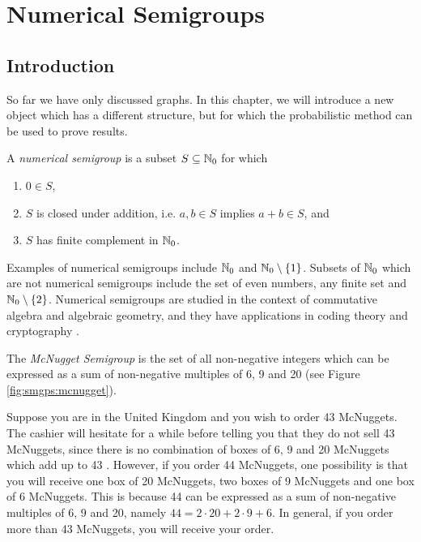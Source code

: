 \chapter{Numerical Semigroups}\label{chap:numsems}

\section{Introduction}\label{sec:smgps:intro}

So far we have only discussed graphs. In this chapter, we will introduce a new object which has a different structure, but for which the probabilistic method can be used to prove results. \par

\begin{definition} \cite{rosales2009numerical}
    A \textit{numerical semigroup} is a subset $S \subseteq \mathbb{N}_{0}$ for which 
    \begin{enumerate}
        \item $0 \in S$,
        \item $S$ is closed under addition, i.e. $a, b \in S$ implies $a + b \in S$, and
        \item $S$ has finite complement in $\mathbb{N}_{0}$.
    \end{enumerate}
\end{definition}

Examples of numerical semigroups include $\mathbb{N}_{0}$ and $\mathbb{N}_{0} \setminus \{1\}$. Subsets of $\mathbb{N}_0$ which are not numerical semigroups include the set of even numbers, any finite set and $\mathbb{N}_0 \setminus \{2\}$. Numerical semigroups are studied in the context of commutative algebra and algebraic geometry, and they have applications in coding theory and cryptography \cite{assi2020numerical}. \par

\begin{example}\label{ex:smgps:mcnugget}
    The \textit{McNugget Semigroup} is the set of all non-negative integers which can be expressed as a sum of non-negative multiples of 6, 9 and 20 (see Figure \ref{fig:smgps:mcnugget}).
\end{example}

Suppose you are in the United Kingdom and you wish to order 43 McNuggets. The cashier will hesitate for a while before telling you that they do not sell 43 McNuggets, since there is no combination of boxes of 6, 9 and 20 McNuggets which add up to 43 \cite{youtube}. However, if you order 44 McNuggets, one possibility is that you will receive one box of 20 McNuggets, two boxes of 9 McNuggets and one box of 6 McNuggets. This is because 44 can be expressed as a sum of non-negative multiples of 6, 9 and 20, namely $44 = 2 \cdot 20 + 2 \cdot 9 + 6$. In general, if you order more than 43 McNuggets, you will receive your order. \par

